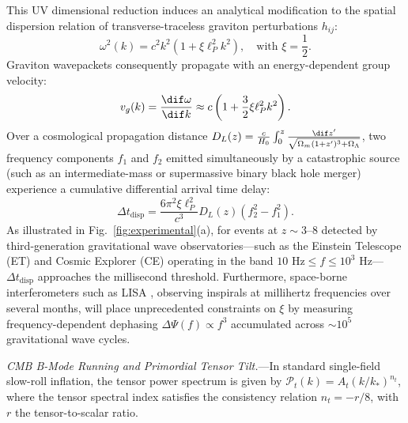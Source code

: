 This UV dimensional reduction induces an analytical modification to the spatial dispersion relation of transverse-traceless graviton perturbations $h_{ij}$:
\begin{equation}
    \label{eq:dispersion}
    \omega^2(k) = c^2 k^2 \left( 1 + \xi \ell_P^2 k^2 \right), \quad \text{with } \xi = \frac{1}{2}.
\end{equation}
Graviton wavepackets consequently propagate with an energy-dependent group velocity:
\begin{equation}
    v_g(k) = \frac{\dif \omega}{\dif k} \approx c \left( 1 + \frac{3}{2}\xi \ell_P^2 k^2 \right).
\end{equation}
Over a cosmological propagation distance $D_L(z) = \frac{c}{H_0} \int_0^z \frac{\dif z'}{\sqrt{\Omega_m(1+z')^3 + \Omega_\Lambda}}$, two frequency components $f_1$ and $f_2$ emitted simultaneously by a catastrophic source (such as an intermediate-mass or supermassive binary black hole merger) experience a cumulative differential arrival time delay:
\begin{equation}
    \label{eq:delta_t}
    \Delta t_{\mathrm{disp}} = \frac{6 \pi^2 \xi \ell_P^2}{c^3} D_L(z) \left( f_2^2 - f_1^2 \right).
\end{equation}
As illustrated in Fig.~\ref{fig:experimental}(a), for events at $z \sim 3$--$8$ detected by third-generation gravitational wave observatories—such as the Einstein Telescope (ET) \cite{punturo2010einstein} and Cosmic Explorer (CE) \cite{reitze2019cosmic} operating in the band $10\text{ Hz} \le f \le 10^3\text{ Hz}$—$\Delta t_{\mathrm{disp}}$ approaches the millisecond threshold. Furthermore, space-borne interferometers such as LISA \cite{amaro2017laser}, observing inspirals at millihertz frequencies over several months, will place unprecedented constraints on $\xi$ by measuring frequency-dependent dephasing $\Delta \Psi(f) \propto f^3$ accumulated across $\sim 10^5$ gravitational wave cycles.

\emph{CMB B-Mode Running and Primordial Tensor Tilt.}---In standard single-field slow-roll inflation, the tensor power spectrum is given by $\mathcal{P}_t(k) = A_t (k / k_*)^{n_t}$, where the tensor spectral index satisfies the consistency relation $n_t = -r / 8$, with $r$ the tensor-to-scalar ratio.

